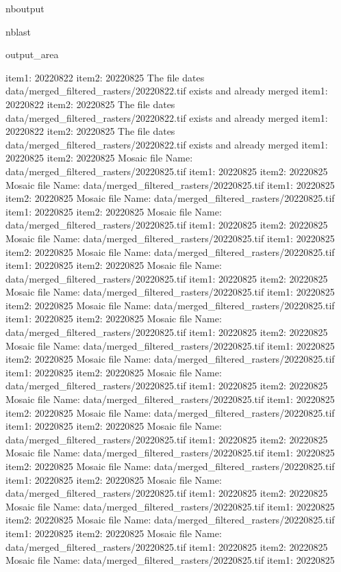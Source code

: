 \documentclass[letterpaper,10pt]{sphinxmanual}
\begin{document}
\begin{sphinxuseclass}{nboutput}
\begin{sphinxuseclass}{nblast}
{\begin{sphinxuseclass}{output_area}
\begin{sphinxuseclass}{}
\begin{sphinxVerbatim}[commandchars=\\\{\}]
item1:  20220822
item2:  20220825
The file dates data/merged\_filtered\_rasters/20220822.tif exists and already merged
item1:  20220822
item2:  20220825
The file dates data/merged\_filtered\_rasters/20220822.tif exists and already merged
item1:  20220822
item2:  20220825
The file dates data/merged\_filtered\_rasters/20220822.tif exists and already merged
item1:  20220825
item2:  20220825
Mosaic file Name:  data/merged\_filtered\_rasters/20220825.tif
item1:  20220825
item2:  20220825
Mosaic file Name:  data/merged\_filtered\_rasters/20220825.tif
item1:  20220825
item2:  20220825
Mosaic file Name:  data/merged\_filtered\_rasters/20220825.tif
item1:  20220825
item2:  20220825
Mosaic file Name:  data/merged\_filtered\_rasters/20220825.tif
item1:  20220825
item2:  20220825
Mosaic file Name:  data/merged\_filtered\_rasters/20220825.tif
item1:  20220825
item2:  20220825
Mosaic file Name:  data/merged\_filtered\_rasters/20220825.tif
item1:  20220825
item2:  20220825
Mosaic file Name:  data/merged\_filtered\_rasters/20220825.tif
item1:  20220825
item2:  20220825
Mosaic file Name:  data/merged\_filtered\_rasters/20220825.tif
item1:  20220825
item2:  20220825
Mosaic file Name:  data/merged\_filtered\_rasters/20220825.tif
item1:  20220825
item2:  20220825
Mosaic file Name:  data/merged\_filtered\_rasters/20220825.tif
item1:  20220825
item2:  20220825
Mosaic file Name:  data/merged\_filtered\_rasters/20220825.tif
item1:  20220825
item2:  20220825
Mosaic file Name:  data/merged\_filtered\_rasters/20220825.tif
item1:  20220825
item2:  20220825
Mosaic file Name:  data/merged\_filtered\_rasters/20220825.tif
item1:  20220825
item2:  20220825
Mosaic file Name:  data/merged\_filtered\_rasters/20220825.tif
item1:  20220825
item2:  20220825
Mosaic file Name:  data/merged\_filtered\_rasters/20220825.tif
item1:  20220825
item2:  20220825
Mosaic file Name:  data/merged\_filtered\_rasters/20220825.tif
item1:  20220825
item2:  20220825
Mosaic file Name:  data/merged\_filtered\_rasters/20220825.tif
item1:  20220825
item2:  20220825
Mosaic file Name:  data/merged\_filtered\_rasters/20220825.tif
item1:  20220825
item2:  20220825
Mosaic file Name:  data/merged\_filtered\_rasters/20220825.tif
item1:  20220825
item2:  20220825
Mosaic file Name:  data/merged\_filtered\_rasters/20220825.tif
item1:  20220825
item2:  20220825
Mosaic file Name:  data/merged\_filtered\_rasters/20220825.tif
item1:  20220825
item2:  20220825
Mosaic file Name:  data/merged\_filtered\_rasters/20220825.tif
item1:  20220825
item2:  20220825
Mosaic file Name:  data/merged\_filtered\_rasters/20220825.tif
item1:  20220825

\end{sphinxVerbatim}
\end{sphinxuseclass}
\end{sphinxuseclass}}
\end{sphinxuseclass}
\end{sphinxuseclass}
\end{document}
